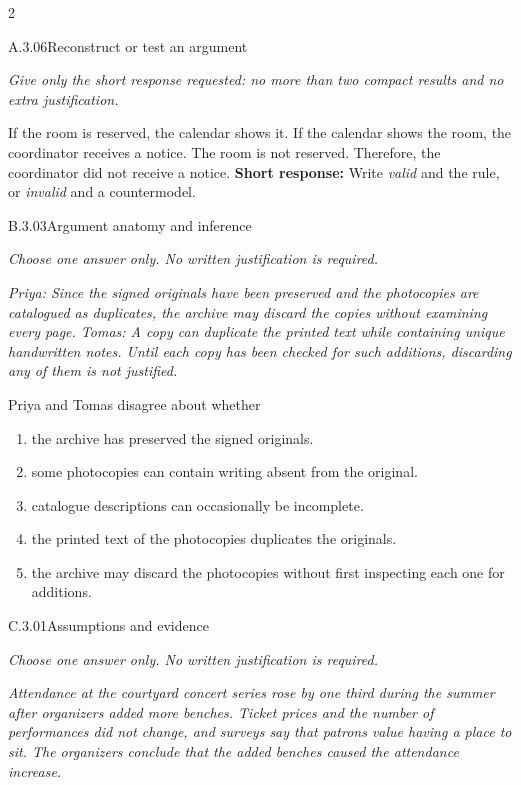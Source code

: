 \documentclass[9pt]{extarticle}
\newcommand{\choice}[1]{\item #1}
\begin{document}
\begin{multicols}{2}
\begin{DenseCoreProblem}{A.3.06}{Reconstruct or test an argument}
{\scriptsize\textit{Give only the short response requested: no more than two compact results and no extra justification.}\par}
If the room is reserved, the calendar shows it. If the calendar shows the room, the coordinator receives a notice. The room is not reserved. Therefore, the coordinator did not receive a notice.
\textbf{Short response:} Write \emph{valid} and the rule, or \emph{invalid} and a countermodel.
\end{DenseCoreProblem}
\begin{DenseCoreProblem}{B.3.03}{Argument anatomy and inference}
{\scriptsize\textit{Choose one answer only. No written justification is required.}\par}
\emph{Priya: Since the signed originals have been preserved and the photocopies are catalogued as duplicates, the archive may discard the copies without examining every page. Tomas: A copy can duplicate the printed text while containing unique handwritten notes. Until each copy has been checked for such additions, discarding any of them is not justified.}

Priya and Tomas disagree about whether
\begin{enumerate}[label=(\alph*)]
  \choice{the archive has preserved the signed originals.}
  \choice{some photocopies can contain writing absent from the original.}
  \choice{catalogue descriptions can occasionally be incomplete.}
  \choice{the printed text of the photocopies duplicates the originals.}
  \choice{the archive may discard the photocopies without first inspecting each one for additions.}
\end{enumerate}
\end{DenseCoreProblem}
\columnbreak
\begin{DenseCoreProblem}{C.3.01}{Assumptions and evidence}
{\scriptsize\textit{Choose one answer only. No written justification is required.}\par}
\emph{Attendance at the courtyard concert series rose by one third during the summer after organizers added more benches. Ticket prices and the number of performances did not change, and surveys say that patrons value having a place to sit. The organizers conclude that the added benches caused the attendance increase.}


\end{DenseCoreProblem}
\end{multicols}
\end{document}
